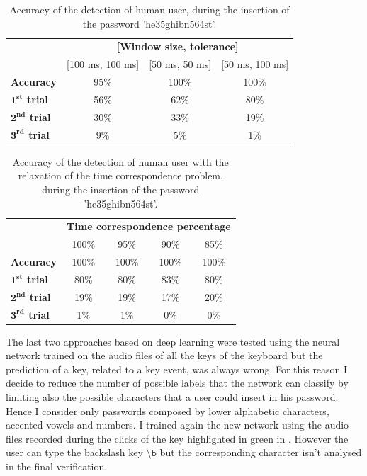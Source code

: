 \begin{table}[H]
\centering\footnotesize
\begin{tabular}{lccc}
\cline{2-4}
&\multicolumn{3}{c}{\textbf{[Window size, tolerance]}}\\
\cline{2-4}
&{[100 ms, 100 ms]}&{[50 ms, 50 ms]}&{[50 ms, 100 ms]}\\
\hline
{\textbf{Accuracy}}&{95\%}&{100\%}&{100\%}\\
\hline
{\textbf{$\mathbf{1^{st}}$ trial}}&{56\%}&{62\%}&{80\%}\\
\hline
{\textbf{$\mathbf{2^{nd}}$ trial}}&{30\%}&{33\%}&{19\%}\\
\hline
{\textbf{$\mathbf{3^{rd}}$ trial}}&{9\%}&{5\%}&{1\%}\\
\hline
\end{tabular}
\caption{\footnotesize{Accuracy of the detection of human user, during the insertion of the password 'he35ghibn564st'.}}
\label{Results:he35ghibn564st}
\end{table}
\begin{table}[H]
\centering\footnotesize
\begin{tabular}{lcccc}
\cline{2-5}
&\multicolumn{4}{c}{\textbf{Time correspondence percentage}}\\
\cline{2-5}
&{100\%}&{95\%}&{90\%}&{85\%}\\
\hline
{\textbf{Accuracy}}&{100\%}&{100\%}&{100\%}&{100\%}\\
\hline
{\textbf{$\mathbf{1^{st}}$ trial}}&{80\%}&{80\%}&{83\%}&{80\%}\\
\hline
{\textbf{$\mathbf{2^{nd}}$ trial}}&{19\%}&{19\%}&{17\%}&{20\%}\\
\hline
{\textbf{$\mathbf{3^{rd}}$ trial}}&{1\%}&{1\%}&{0\%}&{0\%}\\
\hline
\end{tabular}
\caption{\footnotesize{Accuracy of the detection of human user with the relaxation of the time correspondence problem, during the insertion of the password 'he35ghibn564st'.}}
\label{Results:relaxation_time}
\end{table}
The last two approaches based on deep learning were tested using the neural network trained on the audio files of all the keys of the keyboard but the prediction of a key, related to a key event, was always wrong. For this reason I decide to reduce the number of possible labels that the network can classify by limiting also the possible characters that a user could insert in his password.\\
Hence I consider only passwords composed by lower alphabetic characters, accented vowels and numbers. I trained again the new network using the audio files recorded during the clicks of the key highlighted in green in . However the user can type the backslash key $\mathtt{\setminus b}$ but the corresponding character isn't analysed in the final verification.\\
